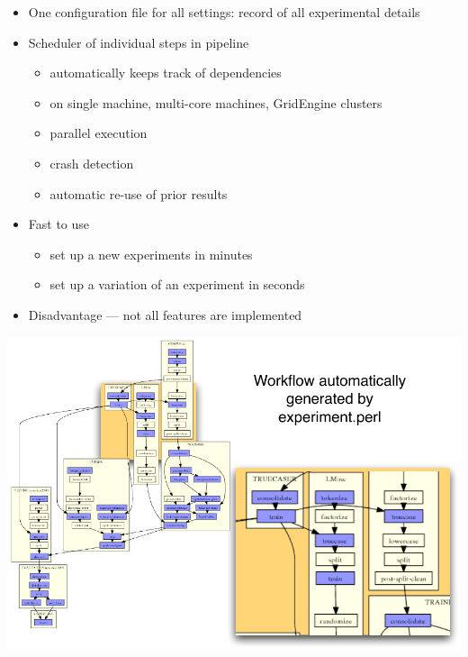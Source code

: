 \documentclass[landscape]{uedslides2C}
\begin{document}
\begin{itemize} \itemsep -1mm
\item One configuration file for all settings: record of all experimental details
\item Scheduler of individual steps in pipeline
\begin{itemize}
\item automatically keeps track of dependencies
\item on single machine, multi-core machines, GridEngine clusters
\item parallel execution 
\item crash detection
\item automatic re-use of prior results
\end{itemize}
\item Fast to use
\begin{itemize}
\item set up a new experiments in minutes
\item set up a variation of an experiment in seconds
\end{itemize}

\item Disadvantage --- not all features are implemented

\end{itemize}


\slide{}
\begin{center} \vspace{-5mm}
\includegraphics[scale=1.41]{ems-agenda-composite.pdf}
\end{center}
\end{document}

